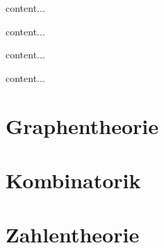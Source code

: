 \begin{definition}[Relationen]
	content...
\end{definition}

\begin{definition}[Funktionen]
	content...
\end{definition}

\begin{definition}[Kardinalitäten]
	content...
\end{definition}

\begin{definition}[Multimenge]
	content...
\end{definition}



\section{Graphentheorie}


\section{Kombinatorik}

\section{Zahlentheorie}

